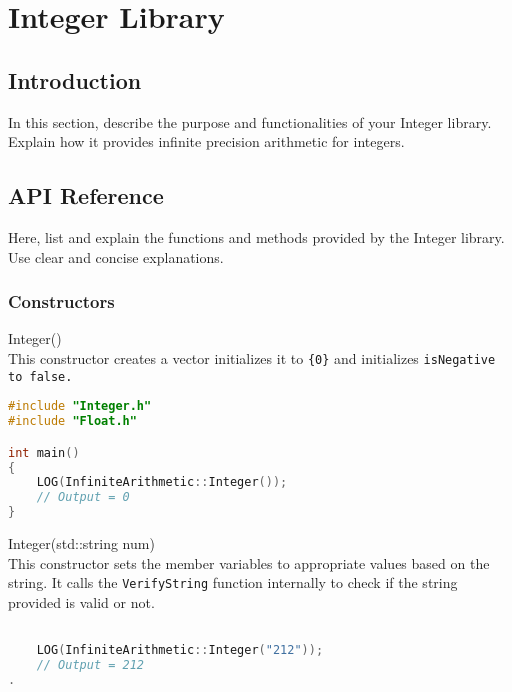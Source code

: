 
\section{Integer Library}

\subsection{Introduction}

In this section, describe the purpose and functionalities of your Integer library. Explain how it provides infinite precision arithmetic for integers. 

\subsection{API Reference}

Here, list and explain the functions and methods provided by the Integer library. Use clear and concise explanations.

\subsubsection{Constructors} \vspace*{1em}

{\ttfamily \large Integer()} \\[2mm]
This constructor creates a vector initializes it to \verb|{0}| and initializes \tt{isNegative} to \tt{false}.
\vspace*{1em}
\begin{lstlisting}[language = C]
#include "Integer.h"
#include "Float.h"

int main()
{
	LOG(InfiniteArithmetic::Integer());
	// Output = 0
}
\end{lstlisting}
\vspace*{1em}


\noindent
{\ttfamily \large Integer(std::string num)} \\[2mm]
This constructor sets the member variables to appropriate values based on the string. It calls the \verb|VerifyString| function internally to check if the string provided is valid or not.
\vspace*{1em}
\begin{lstlisting}[language = C]

	LOG(InfiniteArithmetic::Integer("212"));
	// Output = 212
.
\end{lstlisting}
\vspace*{1em}


